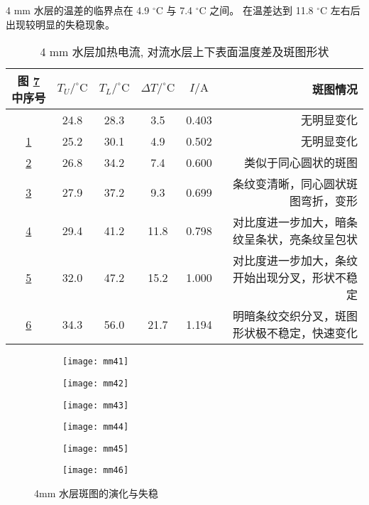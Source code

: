 \documentclass[aps,pre,12pt,preprint,onecolumn,showpacs,showkeys]{revtex4-1}
\def \degree {^\circ}
\def \degC {^\circ \mathrm{C}}
\begin{document}
	4 mm 水层的温差的临界点在 4.9 $\degC$ 与 7.4 $\degC$ 之间。 在温差达到 11.8 $\degC$ 左右后出现较明显的失稳现象。
	
	\begin{table}[h]
		\caption{\label{tab:4mm}%
		4 mm 水层加热电流, 对流水层上下表面温度差及斑图形状}
		\begin{tabular}{cccccr}
			\hline
			图 \ref{fig:4mm} 中序号&$T_U/\degree \mathrm{C}$&$T_L/\degree \mathrm{C}$&$\Delta T/\degree \mathrm{C}$&$I/\mathrm{A}$&斑图情况\\\hline
			 & 24.8 & 28.3 & 3.5 & 0.403 & 无明显变化 \\
			\ref{fig:4mma} & 25.2 & 30.1 & 4.9 & 0.502 & 无明显变化 \\
			\ref{fig:4mmb} & 26.8 & 34.2 & 7.4 & 0.600 & 类似于同心圆状的斑图\\
			\ref{fig:4mmc} & 27.9 & 37.2 & 9.3 & 0.699 & 条纹变清晰，同心圆状斑图弯折，变形\\
			\ref{fig:4mmd} & 29.4 & 41.2 & 11.8 & 0.798 & 对比度进一步加大，暗条纹呈条状，亮条纹呈包状\\
			\ref{fig:4mme} & 32.0 & 47.2 & 15.2 & 1.000 & \quad 对比度进一步加大，条纹开始出现分叉，形状不稳定\\
			\ref{fig:4mmf} & 34.3 & 56.0 & 21.7 & 1.194 & 明暗条纹交织分叉，斑图形状极不稳定，快速变化 \\\hline
		\end{tabular}
	\end{table}
	
	\begin{figure}[h]
	\centering
		\begin{subfigure}[t]{45mm}
			\centering
			\texttt{[image: mm41]}
			\caption{}\label{fig:4mma}
		\end{subfigure}
		\begin{subfigure}[t]{45mm}
			\centering
			\texttt{[image: mm42]}
			\caption{}\label{fig:4mmb}
		\end{subfigure}
		\begin{subfigure}[t]{45mm}
			\centering
			\texttt{[image: mm43]}
			\caption{}\label{fig:4mmc}
		\end{subfigure}
		\begin{subfigure}[t]{45mm}
			\centering
			\texttt{[image: mm44]}
			\caption{}\label{fig:4mmd}
		\end{subfigure}
		\begin{subfigure}[t]{45mm}
			\centering
			\texttt{[image: mm45]}
			\caption{}\label{fig:4mme}
		\end{subfigure}
		\begin{subfigure}[t]{45mm}
			\centering
			\texttt{[image: mm46]}
			\caption{}\label{fig:4mmf}
		\end{subfigure}
		\caption{4mm 水层斑图的演化与失稳}\label{fig:4mm}
	\end{figure}
	
\end{document}
